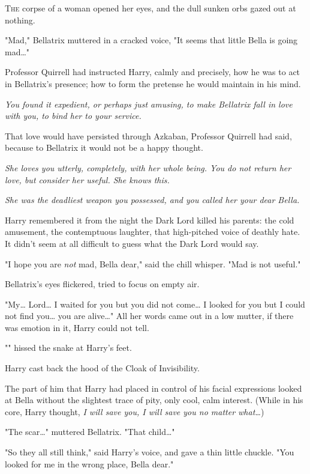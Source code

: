 
\lettrine{T}{he} corpse of a
woman opened her eyes, and the dull sunken orbs gazed out at nothing.

"Mad," Bellatrix muttered in a cracked voice, "It seems that little Bella is
going mad{\ldots}"

Professor Quirrell had instructed Harry, calmly and precisely, how he was to
act in Bellatrix's presence; how to form the pretense he would maintain in his
mind.

\emph{You found it expedient, or perhaps just amusing, to make Bellatrix fall
in love with you, to bind her to your service.}

That love would have persisted through Azkaban, Professor Quirrell had said,
because to Bellatrix it would not be a happy thought.

\emph{She loves you utterly, completely, with her whole being. You do not
return her love, but consider her useful. She knows this.}

\emph{She was the deadliest weapon you possessed, and you called her your dear
Bella.}

Harry remembered it from the night the Dark Lord killed his parents: the cold
amusement, the contemptuous laughter, that high-pitched voice of deathly hate.
It didn't seem at all difficult to guess what the Dark Lord would say.

"I hope you are \emph{not} mad, Bella dear," said the chill whisper. "Mad is
not useful."

Bellatrix's eyes flickered, tried to focus on empty air.

"My{\ldots} Lord{\ldots} I waited for you but you did not come{\ldots} I looked
for you but I could not find you{\ldots} you are alive{\ldots}" All her words
came out in a low mutter, if there was emotion in it, Harry could not tell.

"" hissed the snake at Harry's feet.

Harry cast back the hood of the Cloak of Invisibility.

The part of him that Harry had placed in control of his facial expressions
looked at Bella without the slightest trace of pity, only cool, calm interest.
(While in his core, Harry thought, \emph{I will save you, I will save you no
matter what{\ldots}})

"The scar{\ldots}" muttered Bellatrix. "That child{\ldots}"

"So they all still think," said Harry's voice, and gave a thin little chuckle.
"You looked for me in the wrong place, Bella dear."


